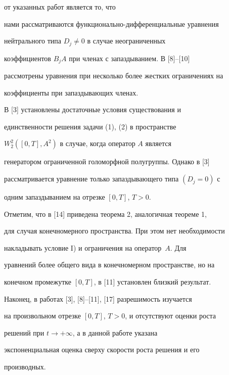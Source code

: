 от указанных работ является то, что


нами рассматриваются функционально-дифференциальные уравнения


нейтрального типа $D_j\neq 0$ в случае неограниченных


коэффициентов $B_jA$ при членах с запаздыванием. В [8]--[10]


рассмотрены уравнения при несколько более жестких ограничениях на


коэффициенты при запаздывающих членах.








В [3] установлены достаточные условия существования и


единственности решения задачи (1), (2) в пространстве


$W^2_2([0,T],A^2)$ в случае, когда оператор $A$ является


генератором ограниченной голоморфной полугруппы. Однако в [3]


рассматривается уравнение только запаздывающего типа $(D_j=0)$ с


одним запаздыванием на отрезке $[0,T]$, $T>0$.





Отметим, что в [14] приведена теорема 2, аналогичная теореме 1,


для случая конечномерного пространства. При этом нет необходимости


накладывать условие I) и ограничения на оператор~$A$. Для


уравнений более общего вида в конечномерном пространстве, но на


конечном промежутке $[0,T]$, в [11] установлен близкий результат.





Наконец, в работах [3], [8]--[11], [17] разрешимость изучается


на произвольном отрезке $[0,T]$, $T>0$, и отсутствуют оценки роста


решений при $t\to +\infty $, а в данной работе указана


экспоненциальная оценка сверху скорости роста решения и его


производных.








